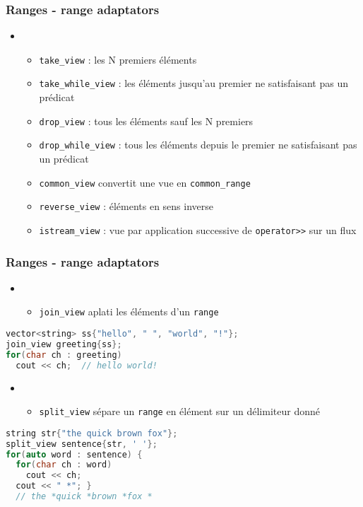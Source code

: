 \documentclass[C++.tex]{subfiles}
\begin{document}
\begin{frame}[fragile]
	\frametitle{Ranges - range adaptators}
	\begin{itemize}
		\item  [] \begin{itemize}
			\item \lstinline|take_view| : les N premiers éléments
			\item \lstinline|take_while_view| : les éléments jusqu'au premier ne satisfaisant pas un prédicat
			\item \lstinline|drop_view| : tous les éléments sauf les N premiers
			\item \lstinline|drop_while_view| : tous les éléments depuis le premier ne satisfaisant pas un prédicat
			\item \lstinline|common_view| convertit une vue en \lstinline|common_range|
			\item \lstinline|reverse_view| : éléments en sens inverse
			\item \lstinline|istream_view| : vue par application successive de \lstinline|operator>>| sur un flux
		\end{itemize}
	\end{itemize}
\end{frame}

\begin{frame}[fragile]
	\frametitle{Ranges - range adaptators}
	\begin{itemize}
		\item  [] \begin{itemize}
			\item \lstinline|join_view| \og aplati\fg{} les éléments d'un \lstinline|range|
		\end{itemize}
	\end{itemize}

	\begin{lstlisting}[language=C++]
vector<string> ss{"hello", " ", "world", "!"};
join_view greeting{ss};
for(char ch : greeting)
  cout << ch;  // hello world!\end{lstlisting}

	\begin{itemize}
		\item  [] \begin{itemize}
			\item \lstinline|split_view| sépare un \lstinline|range| en élément sur un délimiteur donné
		\end{itemize}
	\end{itemize}

	\begin{lstlisting}[language=C++]
string str{"the quick brown fox"};
split_view sentence{str, ' '};
for(auto word : sentence) {
  for(char ch : word)
    cout << ch;
  cout << " *"; }
  // the *quick *brown *fox *\end{lstlisting}
\end{frame}
\end{document}
